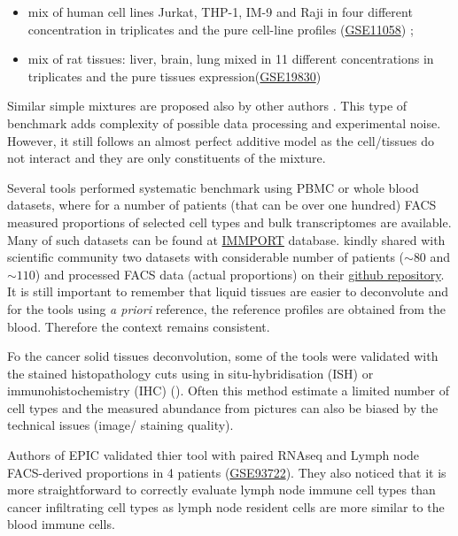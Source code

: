 \documentclass[12pt,]{book}
\providecommand{\tightlist}{%
  \setlength{\itemsep}{0pt}\setlength{\parskip}{0pt}}
\theoremstyle{definition}
\theoremstyle{definition}
\theoremstyle{definition}
\theoremstyle{remark}
\begin{document}
\begin{itemize}
\tightlist
\item
  mix of human cell lines Jurkat, THP-1, IM-9 and Raji in four different
  concentration in triplicates and the pure cell-line profiles
  (\href{https://www.ncbi.nlm.nih.gov/geo/query/acc.cgi?acc=GSE11058}{GSE11058})
  \citep{Abbas2009};
\item
  mix of rat tissues: liver, brain, lung mixed in 11 different
  concentrations in triplicates and the pure tissues
  expression(\href{https://www.ncbi.nlm.nih.gov/geo/query/acc.cgi?acc=GSE19830}{GSE19830})
  \citep{ShenOrr2010}
\end{itemize}

Similar simple mixtures are proposed also by other authors
\citep[\citet{Kuhn2011}]{Becht2016}. This type of benchmark adds
complexity of possible data processing and experimental noise. However,
it still follows an almost perfect additive model as the cell/tissues do
not interact and they are only constituents of the mixture.

Several tools performed systematic benchmark using PBMC or whole blood
datasets, where for a number of patients (that can be over one hundred)
FACS measured proportions of selected cell types and bulk transcriptomes
are available. Many of such datasets can be found at
\href{http://www.immport.org/immport-open/public/home/home}{IMMPORT}
database. \citet{Aran2017} kindly shared with scientific community two
datasets with considerable number of patients (\(\sim80\) and
\(\sim110\)) and processed FACS data (actual proportions) on their
\href{https://github.com/dviraran/xCell/blob/master/Dev_scripts/xCell_ImmPort.zip}{github
repository}. It is still important to remember that liquid tissues are
easier to deconvolute and for the tools using \emph{a priori} reference,
the reference profiles are obtained from the blood. Therefore the
context remains consistent.

Fo the cancer solid tissues deconvolution, some of the tools were
validated with the stained histopathology cuts using in
situ-hybridisation (ISH) \citep{Kuhn2011} or immunohistochemistry (IHC)
(\citet{Becht2016}). Often this method estimate a limited number of cell
types and the measured abundance from pictures can also be biased by the
technical issues (image/ staining quality).

Authors of EPIC validated thier tool with paired RNAseq and Lymph node
FACS-derived proportions in 4 patients
(\href{https://www.ncbi.nlm.nih.gov/geo/query/acc.cgi?acc=GSE93722}{GSE93722}).
They also noticed that it is more straightforward to correctly evaluate
lymph node immune cell types than cancer infiltrating cell types as
lymph node resident cells are more similar to the blood immune cells.
\end{document}
